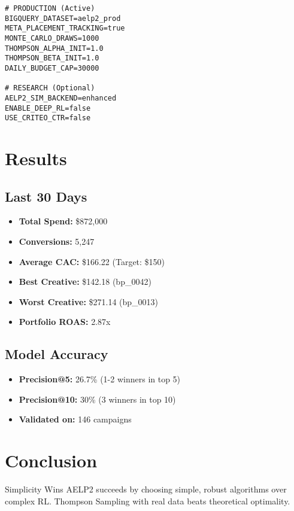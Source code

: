 \documentclass[11pt,a4paper]{report}
\begin{document}
\begin{verbatim}
# PRODUCTION (Active)
BIGQUERY_DATASET=aelp2_prod
META_PLACEMENT_TRACKING=true
MONTE_CARLO_DRAWS=1000
THOMPSON_ALPHA_INIT=1.0
THOMPSON_BETA_INIT=1.0
DAILY_BUDGET_CAP=30000

# RESEARCH (Optional)
AELP2_SIM_BACKEND=enhanced
ENABLE_DEEP_RL=false
USE_CRITEO_CTR=false
\end{verbatim}

\chapter{Results}

\section{Last 30 Days}

\begin{itemize}
\item \textbf{Total Spend:} \$872,000
\item \textbf{Conversions:} 5,247
\item \textbf{Average CAC:} \$166.22 (Target: \$150)
\item \textbf{Best Creative:} \$142.18 (bp\_0042)
\item \textbf{Worst Creative:} \$271.14 (bp\_0013)
\item \textbf{Portfolio ROAS:} 2.87x
\end{itemize}

\section{Model Accuracy}

\begin{itemize}
\item \textbf{Precision@5:} 26.7\% (1-2 winners in top 5)
\item \textbf{Precision@10:} 30\% (3 winners in top 10)
\item \textbf{Validated on:} 146 campaigns
\end{itemize}

\chapter{Conclusion}

\begin{insightbox}{Simplicity Wins}
AELP2 succeeds by choosing simple, robust algorithms over complex RL. Thompson Sampling with real data beats theoretical optimality.
\end{insightbox}
\end{document}
